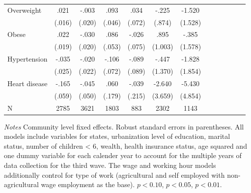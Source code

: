 \documentclass[12pt,english]{article}
\begin{document}
\begin{table}[h]
\begin{center}
\begin{adjustbox}{max width=\linewidth}
\begin{threeparttable}
{\begin{tabular}{l*{6}{S
S}}
Overweight &     .021         &    -.003         &     .093\sym{**} &     .034         &    -.225         &   -1.520         \\
                &   (.016)         &   (.020)         &   (.046)         &   (.072)         &   (.874)         &  (1.528)         \\
Obese&     .022         &    -.030         &     .086         &    -.026         &     .895         &    -.385         \\
                &   (.019)         &   (.020)         &   (.053)         &   (.075)         &  (1.003)         &  (1.578)         \\
Hypertension    &    -.035         &    -.020         &    -.106         &    -.089         &    -.447         &   -1.828         \\
                &   (.025)         &   (.022)         &   (.072)         &   (.089)         &  (1.370)         &  (1.854)         \\
Heart disease   &    -.165\sym{***}&    -.045         &     .060         &    -.039         &   -2.640         &   -5.430         \\
                &   (.059)         &   (.050)         &   (.179)         &   (.215)         &  (3.659)         &  (4.854)         \\
N               &     2785         &     3621         &     1803         &      883         &     2302         &     1143         \\

\bottomrule
\end{tabular}
\begin{tablenotes}
\item \footnotesize \textit{Notes} Community level fixed effects. Robust standard errors in parentheses. All models include variables for  states, urbanization level of education, marital status, number of children < 6, wealth, health insurance status, age squared and one dummy variable for each calender year to account for the multiple years of data collection for the third wave. The wage and working hour models additionally control for type of work (agricultural and self employed with non-agricultural wage employment as the base). \sym{*} \(p<0.10\), \sym{**} \(p<0.05\), \sym{***} \(p<0.01\).
\end{tablenotes}
}
\end{threeparttable}
\end{adjustbox}
\end{center}
\end{table}
\end{document}

